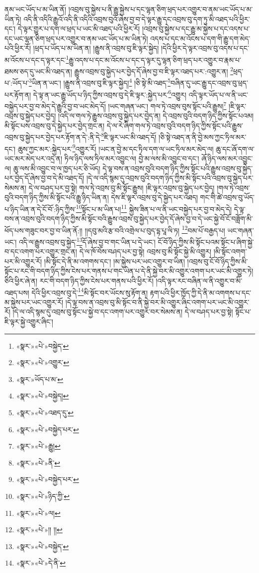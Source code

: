 ནམ་ཡང་ཡོད་པ་མ་ཡིན་ནོ། །འབྲས་བུ་སྐྱེས་པ་ནི་རྒྱུ་སྐྱེས་པ་དང་ལྷན་ཅིག་ཕྲད་པར་འགྱུར་བ་ནམ་ཡང་ཡོད་པ་མ་ཡིན་ཏེ། འདི་ནི་འདིའི་རྒྱུའོ་འདི་ནི་འདིའི་འབྲས་བུའོ་ཞེས་བྱ་བ་དེ་ལྟར་རྒྱུ་དང་འབྲས་བུ་དག་ཏུ་མི་འཐད་པའི་ཕྱིར་དང་། དེ་ལྟར་གྱུར་པ་དག་ལ་ཕྲད་པ་ཡང་མི་འཐད་པའི་ཕྱིར་རོ། །འབྲས་བུ་སྐྱེས་པ་དང་རྒྱུ་མ་སྐྱེས་པ་དང་འདས་པ་དང་ཡང་ལྷན་ཅིག་ཕྲད་པར་འགྱུར་བ་ནམ་ཡང་ཡོད་པ་མ་ཡིན་ཏེ། འདས་པ་དང་མ་འོངས་པ་དག་གི་རྒྱུ་དག་མེད་པའི་ཕྱིར་རོ། །ཕྲད་པ་ཡོད་པ་མ་ཡིན་ན། །རྒྱུས་ནི་འབྲས་བུ་ཇི་ལྟར་སྐྱེད། །དེའི་ཕྱིར་དེ་ལྟར་འབྲས་བུ་འདས་པ་དང་མ་འོངས་པ་དང་ད་ལྟར་དང་\footnote{«སྣར་»«པེ་»བསྐྱེད་}རྒྱུ་འདས་པ་དང་མ་འོངས་པ་དང་ད་ལྟར་དུ་ལྷན་ཅིག་ཕྲད་པར་འགྱུར་བ་རྣམ་པ་ཐམས་ཅད་དུ་ཡང་མི་འཐད་ན། རྒྱུས་འབྲས་བུ་སྐྱེད་པར་བྱེད་དོ་ཞེས་བྱ་བ་ཇི་ལྟར་འཐད་པར་:འགྱུར་ན། \footnote{«སྣར་»«པེ་»འགྱུར་}ཕྲད་པ་:ཡོད་པ་\footnote{«སྣར་»ཡོད་པ་མ་}ཡིན་ན་ཡང་། །རྒྱུས་ནི་འབྲས་བུ་ཇི་ལྟར་སྐྱེད།\footnote{«སྣར་»«པེ་»བསྐྱེད།} །ཅི་སྟེ་མི་འཐད་\footnote{«སྣར་»«པེ་»འཐད་དུ་}བཞིན་དུ་ཡང་རྒྱུ་དང་འབྲས་བུ་ཕྲད་པར་རྟོག་ན། དེ་ལྟ་ན་ཡང་རྒྱུ་ཡོད་པ་ཉིད་ཀྱིས་འབྲས་བུ་དེ་ཇི་ལྟར་:སྐྱེད་པར་\footnote{«སྣར་»«པེ་»བསྐྱེད་པར་}འགྱུར། འདི་ལྟར་ཡོད་པ་ལ་ནི་ཡང་བསྐྱེད་པར་བྱ་བ་མེད་དེ་རྒྱུའི་བྱ་བ་ཡང་མེད་དོ། །ཡང་གཞན་ཡང་། གལ་ཏེ་འབྲས་བུས་སྟོང་པའི་རྒྱུས།\footnote{«སྣར་»«པེ་»རྒྱུ།} །ཇི་ལྟར་འབྲས་བུ་སྐྱེད་པར་བྱེད། །འདི་ལ་གལ་ཏེ་རྒྱུས་འབྲས་བུ་སྐྱེད་པར་བྱེད་ན། དེ་འབྲས་བུའི་བདག་ཉིད་ཀྱིས་སྟོང་པའམ། མི་སྟོང་པས་འབྲས་བུ་དེ་སྐྱེད་པར་བྱེད་གྲང་ན། དེ་ལ་རེ་ཞིག་གལ་ཏེ་འབྲས་བུའི་བདག་ཉིད་ཀྱིས་སྟོང་པའི་རྒྱུས་འབྲས་བུ་སྐྱེད་པར་བྱེད་པར་རྟོག་ན་དེ་:ནི་དེ་\footnote{«སྣར་»«པེ་»ནི་}ཇི་ལྟར་ཡང་མི་འཐད་དོ། །ཅི་སྟེ་འཐད་ན་ནི་བྱེ་མས་ཀྱང་ཏིལ་མར་དང་། ཆུས་ཀྱང་མར་:སྐྱེད་པར་\footnote{«སྣར་»«པེ་»བསྐྱེད་པར་}འགྱུར་རོ། །ཡང་ན་བྱེ་མ་དང་ཏིལ་དག་ལ་ཡང་ཏིལ་མར་མེད་ལ། ཆུ་དང་ཞོ་དག་ལ་ཡང་མར་མེད་པར་འདྲ་ན། ཏིལ་ཉིད་ལས་ཏིལ་མར་འབྱུང་ལ། བྱེ་མ་ལས་མི་འབྱུང་བ་དང་། ཞོ་ཉིད་ལས་མར་འབྱུང་ལ། ཆུ་ལས་མི་འབྱུང་བ་ལ་ཁྱད་པར་ཅི་ཡོད། དེ་ལྟ་བས་ན་འབྲས་བུའི་བདག་ཉིད་ཀྱིས་སྟོང་པའི་རྒྱུས་འབྲས་བུ་སྐྱེད་པར་བྱེད་དོ་ཞེས་བྱ་བ་དེ་མི་འཐད་དོ། །དེ་ལ་འདི་སྙམ་དུ་འབྲས་བུའི་བདག་ཉིད་ཀྱིས་མི་སྟོང་པའི་འབྲས་བུ་སྐྱེད་པར་སེམས་ན། དེ་ལ་བཤད་པར་བྱ་སྟེ། གལ་ཏེ་འབྲས་བུ་མི་སྟོང་རྒྱུས། །ཇི་ལྟར་འབྲས་བུ་སྐྱེད་པར་བྱེད། །གལ་ཏེ་འབྲས་བུའི་བདག་ཉིད་ཀྱིས་མི་སྟོང་པའི་རྒྱུ་ཉིད་ཡིན་ན། དེས་ཇི་ལྟར་འབྲས་བུ་དེ་སྐྱེད་པར་འཐད། གང་གི་ཚེ་འབྲས་བུ་ཡོད་པ་ཉིད་ཡིན་ན་དེ་ངོ་བོ་:ཉིད་ཀྱིས་\footnote{«སྣར་»«པེ་»ཉིད་ཀྱི་}སྟོང་པ་མ་ཡིན་པ།\footnote{«སྣར་»«པེ་»ལ།} སྐྱེས་ཟིན་པ་ལ་ནི་ཡང་བསྐྱེད་པར་བྱ་བ་མེད་དེ། དེ་ལྟ་བས་ན་འབྲས་བུའི་བདག་ཉིད་ཀྱིས་མི་སྟོང་བའི་རྒྱུས་འབྲས་བུ་སྐྱེད་པར་བྱེད་དོ་ཞེས་བྱ་བ་དེ་ཡང་སྐྱེ་བོ་ངོ་བཟློག་མི་ཕོད་པས་གཟུང་བར་བྱ་བ་ཡིན་ནོ:།། །།དབུ་མའི་རྩ་བའི་འགྲེལ་པ་བུད་དྷ་པཱ་ལི་ཏ། \footnote{«སྣར་»«པེ་»།། །། }བམ་པོ་བརྒྱད་པ། ཡང་གཞན་ཡང་། འདི་ལ་རྒྱུས་འབྲས་བུ་སྐྱེད་\footnote{«སྣར་»«པེ་»བསྐྱེད་}དོ་ཞེས་བྱ་བ་གང་ཡིན་པ་དེ་ཡང་། ངོ་བོ་ཉིད་ཀྱིས་མི་སྟོང་པའམ་སྟོང་པ་ཞིག་སྐྱེ་བ་དང་འགག་པར་འགྱུར་གྲང་ན། དེ་ལ་ཁོ་བོས་བཤད་པར་བྱ་སྟེ། འབྲས་བུ་མི་སྟོང་སྐྱེ་མི་འགྱུར། །མི་སྟོང་འགག་པར་མི་འགྱུར་རོ། །མི་སྟོང་དེ་ནི་མ་འགགས་དང་། །མ་སྐྱེས་པར་ཡང་འགྱུར་བ་ཡིན། །འབྲས་བུ་ངོ་བོ་ཉིད་ཀྱིས་མི་སྟོང་པ་རང་གི་བདག་ཉིད་ཀྱིས་ངེས་པར་གནས་པ་གང་ཡིན་པ་དེ་ནི་སྐྱེ་བར་མི་འགྱུར་འགག་པར་ཡང་མི་འགྱུར་ཏེ། ཅིའི་ཕྱིར་ཞེ་ན། རང་གི་བདག་ཉིད་ཀྱིས་ངེས་པར་གནས་པའི་ཕྱིར་རོ། །འདི་ལྟར་རང་བཞིན་ལ་ནི་འགྱུར་བ་མི་འཐད་པས། དེའི་ཕྱིར་འབྲས་བུ་དེ་\footnote{«སྣར་»«པེ་»དེ་ནི་}མི་སྟོང་བར་ཡོངས་སུ་རྟོག་ན། རྟག་པའི་ཕྱིར་ཁྱོད་ཀྱི་དེ་ནི་མ་འགགས་པ་དང་མ་སྐྱེས་པར་ཡང་འགྱུར་རོ། །དེ་ལྟ་བས་ན་འབྲས་བུ་མི་སྟོང་བ་ནི་སྐྱེ་བར་མི་འགྱུར་ཞིང་འགག་པར་ཡང་མི་འགྱུར་རོ། །དེ་ལ་འདི་སྙམ་དུ་འབྲས་བུ་སྟོང་པ་སྐྱེ་བ་དང་འགག་པར་འགྱུར་བར་སེམས་ན། དེ་ལ་བཤད་པར་བྱ་སྟེ། སྟོང་པ་ཇི་ལྟར་སྐྱེ་འགྱུར་ཞིང་། 